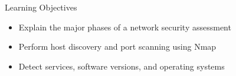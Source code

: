 \begin{frame}[t]{Learning Objectives}
  \begin{itemize}
    \setlength{\itemsep}{0.2cm}
    \item Explain the major phases of a network security assessment
    \item Perform host discovery and port scanning using Nmap
    \item Detect services, software versions, and operating systems
  \end{itemize}
\end{frame}
